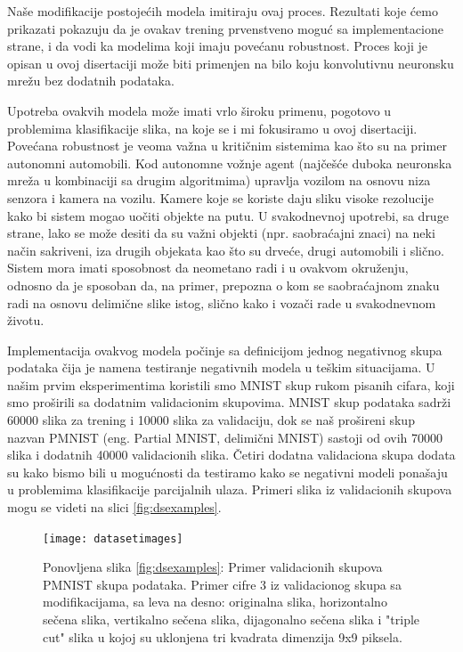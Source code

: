 Naše modifikacije postojećih modela imitiraju ovaj proces. Rezultati koje ćemo prikazati pokazuju da je ovakav trening prvenstveno moguć sa implementacione strane, i da vodi ka modelima koji imaju povećanu robustnost. Proces koji je opisan u ovoj disertaciji može biti primenjen na bilo koju konvolutivnu neuronsku mrežu bez dodatnih podataka.

Upotreba ovakvih modela može imati vrlo široku primenu, pogotovo u problemima klasifikacije slika, na koje se i mi fokusiramo u ovoj disertaciji. Povećana robustnost je veoma važna u kritičnim sistemima kao što su na primer autonomni automobili. Kod autonomne vožnje agent (najčešće duboka neuronska mreža u kombinaciji sa drugim algoritmima) upravlja vozilom na osnovu niza senzora i kamera na vozilu. Kamere koje se koriste daju sliku visoke rezolucije kako bi sistem mogao uočiti objekte na putu. U svakodnevnoj upotrebi, sa druge strane, lako se može desiti da su važni objekti (npr. saobraćajni znaci) na neki način sakriveni, iza drugih objekata kao što su drveće, drugi automobili i slično. Sistem mora imati sposobnost da neometano radi i u ovakvom okruženju, odnosno da je sposoban da, na primer, prepozna o kom se saobraćajnom znaku radi na osnovu delimične slike istog, slično kako i vozači rade u svakodnevnom životu.

Implementacija ovakvog modela počinje sa definicijom jednog negativnog skupa podataka čija je namena testiranje negativnih modela u teškim situacijama. U našim prvim eksperimentima koristili smo MNIST \cite{lecun1998mnist} skup rukom pisanih cifara, koji smo proširili sa dodatnim validacionim skupovima. MNIST skup podataka sadrži 60000 slika za trening i 10000 slika za validaciju, dok se naš prošireni skup nazvan PMNIST (eng. Partial MNIST, delimični MNIST) sastoji od ovih 70000 slika i dodatnih 40000 validacionih slika. Četiri dodatna validaciona skupa dodata su kako bismo bili u mogućnosti da testiramo kako se negativni modeli ponašaju u problemima klasifikacije parcijalnih ulaza. Primeri slika iz validacionih skupova mogu se videti na slici \ref{fig:dsexamples}.

\begin{figure}[htp]
  \centering
  \texttt{[image: datasetimages]}
  
  {Ponovljena slika \ref{fig:dsexamples}: Primer validacionih skupova PMNIST skupa podataka. Primer cifre 3 iz validacionog skupa sa modifikacijama, sa leva na desno: originalna slika, horizontalno sečena slika, vertikalno sečena slika, dijagonalno sečena slika i "triple cut" slika u kojoj su uklonjena tri kvadrata dimenzija 9x9 piksela.}
\end{figure}

